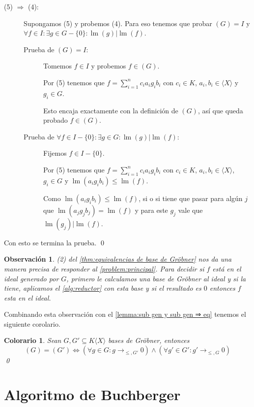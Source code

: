 \documentclass[12pt]{report}
\theoremstyle{customstyle}
\newtheorem{colorary}[theorem]{Colorario}
\newtheorem{observation}[theorem]{Observación}
\renewenvironment{proof}[1][\proofname]{{\noindent \bfseries #1: }}{\qed} %
\theoremstyle{factstyle}
\DeclareMathOperator{\lm}{lm}
\begin{document}
\begin{proof}
\begin{description}
    \item[(5) $⇒$ (4):] Supongamos (5) y probemos (4). Para eso tenemos que probar $(G) = I$ y $∀f ∈ I : ∃g ∈ G - \{0\} : \lm(g) | \lm(f)$.

    \begin{description}
      \item[Prueba de $(G) = I$:] Tomemos $f ∈ I$ y probemos $f ∈ (G)$.

      Por (5) tenemos que $f = ∑_{i = 1}^n c_i a_i g_i b_i$ con $c_i ∈ K$, $a_i, b_i ∈ ⟨X⟩$ y $g_i ∈ G$.

      Esto encaja exactamente con la definición de $(G)$, así que queda probado $f ∈ (G)$.

      \item[Prueba de $∀f ∈ I - \{0\} : ∃g ∈ G : \lm(g) | \lm(f)$:] Fijemos $f ∈ I - \{0\}$.

      Por (5) tenemos que $f = ∑_{i = 1}^n c_i a_i g_i b_i$ con $c_i ∈ K$, $a_i, b_i ∈ ⟨X⟩$, $g_i ∈ G$ y $\lm(a_i g_i b_i) ≤ \lm(f)$.

      Como $\lm(a_i g_i b_i) ≤ \lm(f)$, si o si tiene que pasar para algún $j$ que $\lm(a_j g_j b_j) = \lm(f)$ y para este $g_j$ vale que $\lm(g_j) | \lm(f)$.
    \end{description}

  \end{description}
  Con esto se termina la prueba.
\end{proof}

\begin{observation}
  (2) del \cref{thm:equivalencias de base de Gröbner} nos da una manera precisa de responder al \cref{problem:principal}. Para decidir si $f$ está en el ideal generado por $G$, primero le calculamos una base de Gröbner al ideal y si la tiene, aplicamos el \cref{alg:reductor} con esta base y si el resultado es $0$ entonces $f$ esta en el ideal.
\end{observation}

Combinando esta observación con el \cref{lemma:sub gen y sub gen ⇒ eq} tenemos el siguiente corolario.

\begin{colorary}\label{col:(G) = (G') cond}
  Sean $G, G' ⊆ K⟨X⟩$ bases de Gröbner, entonces
  \[ (G) = (G') ⇔ (∀g ∈ G : g →_{≤, G'} 0) ∧ (∀g' ∈ G' : g' →_{≤, G} 0)\]
  \qed
\end{colorary}


\section{Algoritmo de Buchberger}
\end{document}
